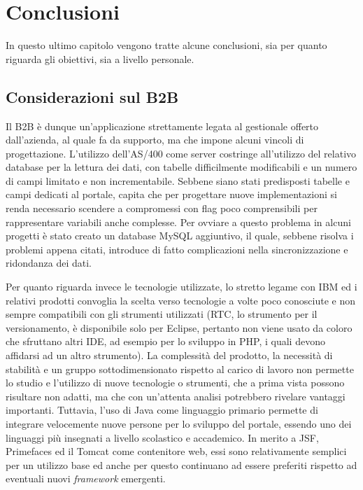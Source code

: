 \chapter{Conclusioni}
\begin{flushright}
	\parbox{13cm}{\small In questo ultimo capitolo vengono tratte alcune conclusioni, sia per quanto riguarda gli obiettivi, sia a livello personale.}
\end{flushright}
\section{Considerazioni sul B2B}
Il B2B è dunque un'applicazione strettamente legata al gestionale offerto dall'azienda, al quale fa da supporto, ma che impone alcuni vincoli di progettazione. L'utilizzo dell'AS/400 come server costringe all'utilizzo del relativo database per la lettura dei dati, con tabelle difficilmente modificabili e un numero di campi limitato e non incrementabile. Sebbene siano stati predisposti tabelle e campi dedicati al portale, capita che per progettare nuove implementazioni si renda necessario scendere a compromessi con flag poco comprensibili per rappresentare variabili anche complesse. Per ovviare a questo problema in alcuni progetti è stato creato un database MySQL aggiuntivo, il quale, sebbene risolva i problemi appena citati, introduce di fatto complicazioni nella sincronizzazione e ridondanza dei dati.

Per quanto riguarda invece le tecnologie utilizzate, lo stretto legame con IBM ed i relativi prodotti convoglia la scelta verso tecnologie a volte poco conosciute e non sempre compatibili con gli strumenti utilizzati (RTC, lo strumento per il versionamento, è disponibile solo per Eclipse, pertanto non viene usato da coloro che sfruttano altri IDE, ad esempio per lo sviluppo in PHP, i quali devono affidarsi ad un altro strumento). La complessità del prodotto, la necessità di stabilità e un gruppo sottodimensionato rispetto al carico di lavoro non permette lo studio e l'utilizzo di nuove tecnologie o strumenti, che a prima vista possono risultare non adatti, ma che con un'attenta analisi potrebbero rivelare vantaggi importanti. Tuttavia, l'uso di Java come linguaggio primario permette di integrare velocemente nuove persone per lo sviluppo del portale, essendo uno dei linguaggi più insegnati a livello scolastico e accademico. In merito a JSF, Primefaces ed il Tomcat come contenitore web, essi sono relativamente semplici per un utilizzo base ed anche per questo continuano ad essere preferiti rispetto ad eventuali nuovi \textit{framework} emergenti.

